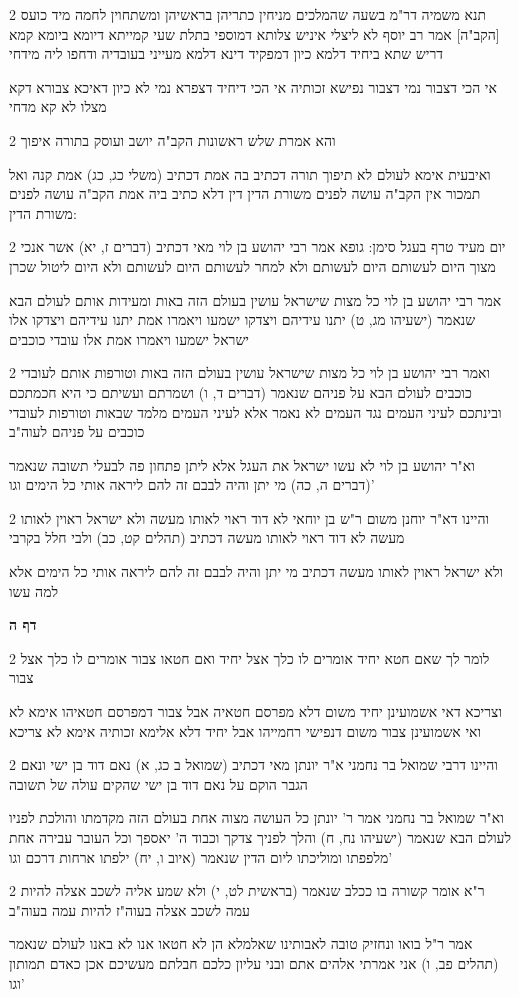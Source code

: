 \documentclass[12pt, openany]{book}
\newcommand{\sethebfont}{
\fontsize{10.5pt}{21.0pt} \selectfont
}
\newcommand{\twocol}[1]{
	{\sethebfont \begin{multicols}{2}
			#1
	\end{multicols}}	
}
\newcommand{\sectname}{}
\newcommand{\newsection}[1]{
	\addcontentsline{toc}{section}{#1}
	\renewcommand{\sectname}{#1}	
	\vspace{-\baselineskip}
	\begin{center}
		\textbf{%
\fontsize{16pt}{16pt}\selectfont
			#1}
	\end{center}
	\vspace{-\baselineskip}
	\nopagebreak
}
\begin{document}
\twocol{תנא משמיה דר"מ בשעה שהמלכים מניחין כתריהן בראשיהן ומשתחוין לחמה מיד כועס [הקב"ה] אמר רב יוסף לא ליצלי איניש צלותא דמוספי בתלת שעי קמייתא דיומא ביומא קמא דריש שתא ביחיד דלמא כיון דמפקיד דינא דלמא מעייני בעובדיה ודחפו ליה מידחי
\par אי הכי דצבור נמי דצבור נפישא זכותיה אי הכי דיחיד דצפרא נמי לא כיון דאיכא צבורא דקא מצלו לא קא מדחי}
\twocol{והא אמרת שלש ראשונות הקב"ה יושב ועוסק בתורה איפוך
\par ואיבעית אימא לעולם לא תיפוך תורה דכתיב בה אמת דכתיב (משלי כג, כג) אמת קנה ואל תמכור אין הקב"ה עושה לפנים משורת הדין דין דלא כתיב ביה אמת הקב"ה עושה לפנים משורת הדין:}
\twocol{יום מעיד טרף בעגל סימן: גופא אמר רבי יהושע בן לוי מאי דכתיב (דברים ז, יא) אשר אנכי מצוך היום לעשותם היום לעשותם ולא למחר לעשותם היום לעשותם ולא היום ליטול שכרן
\par אמר רבי יהושע בן לוי כל מצות שישראל עושין בעולם הזה באות ומעידות אותם לעולם הבא שנאמר (ישעיהו מג, ט) יתנו עידיהם ויצדקו ישמעו ויאמרו אמת יתנו עידיהם ויצדקו אלו ישראל ישמעו ויאמרו אמת אלו עובדי כוכבים}
\twocol{ואמר רבי יהושע בן לוי כל מצות שישראל עושין בעולם הזה באות וטורפות אותם לעובדי כוכבים לעולם הבא על פניהם שנאמר (דברים ד, ו) ושמרתם ועשיתם כי היא חכמתכם ובינתכם לעיני העמים נגד העמים לא נאמר אלא לעיני העמים מלמד שבאות וטורפות לעובדי כוכבים על פניהם לעוה"ב
\par וא"ר יהושע בן לוי לא עשו ישראל את העגל אלא ליתן פתחון פה לבעלי תשובה שנאמר (דברים ה, כה) מי יתן והיה לבבם זה להם ליראה אותי כל הימים וגו'}
\twocol{והיינו דא"ר יוחנן משום ר"ש בן יוחאי לא דוד ראוי לאותו מעשה ולא ישראל ראוין לאותו מעשה לא דוד ראוי לאותו מעשה דכתיב (תהלים קט, כב) ולבי חלל בקרבי
\par ולא ישראל ראוין לאותו מעשה דכתיב מי יתן והיה לבבם זה להם ליראה אותי כל הימים אלא למה עשו}
\newsection{דף ה}
\twocol{לומר לך שאם חטא יחיד אומרים לו כלך אצל יחיד ואם חטאו צבור אומרים לו  כלך אצל צבור
\par וצריכא דאי אשמועינן יחיד משום דלא מפרסם חטאיה אבל צבור דמפרסם חטאיהו אימא לא ואי אשמועינן צבור משום דנפישי רחמייהו אבל יחיד דלא אלימא זכותיה אימא לא צריכא}
\twocol{והיינו דרבי שמואל בר נחמני א"ר יונתן מאי דכתיב (שמואל ב כג, א) נאם דוד בן ישי ונאם הגבר הוקם על נאם דוד בן ישי שהקים עולה של תשובה
\par וא"ר שמואל בר נחמני אמר ר' יונתן כל העושה מצוה אחת בעולם הזה מקדמתו והולכת לפניו לעולם הבא שנאמר (ישעיהו נח, ח) והלך לפניך צדקך וכבוד ה' יאספך וכל העובר עבירה אחת מלפפתו ומוליכתו ליום הדין שנאמר (איוב ו, יח) ילפתו ארחות דרכם וגו'}
\twocol{ר"א אומר קשורה בו ככלב שנאמר (בראשית לט, י) ולא שמע אליה לשכב אצלה להיות עמה לשכב אצלה בעוה"ז להיות עמה בעוה"ב
\par אמר ר"ל בואו ונחזיק טובה לאבותינו שאלמלא הן לא חטאו אנו לא באנו לעולם שנאמר (תהלים פב, ו) אני אמרתי אלהים אתם ובני עליון כלכם חבלתם מעשיכם אכן כאדם תמותון וגו'}
\end{document}
